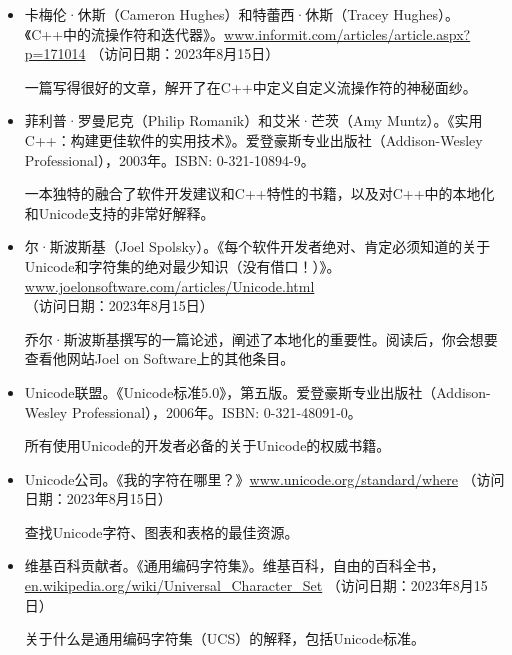 
\begin{itemize}
\item
卡梅伦·休斯（Cameron Hughes）和特蕾西·休斯（Tracey Hughes）。《C++中的流操作符和迭代器》。\url{www.informit.com/articles/article.aspx?p=171014} （访问日期：2023年8月15日）

\hspace*{\fill}

一篇写得很好的文章，解开了在C++中定义自定义流操作符的神秘面纱。

\hspace*{\fill}

\item
菲利普·罗曼尼克（Philip Romanik）和艾米·芒茨（Amy Muntz）。《实用C++：构建更佳软件的实用技术》。爱登豪斯专业出版社（Addison-Wesley Professional），2003年。ISBN: 0-321-10894-9。

\hspace*{\fill}

一本独特的融合了软件开发建议和C++特性的书籍，以及对C++中的本地化和Unicode支持的非常好解释。

\hspace*{\fill}

\item
尔·斯波斯基（Joel Spolsky）。《每个软件开发者绝对、肯定必须知道的关于Unicode和字符集的绝对最少知识（没有借口！）》。\url{www.joelonsoftware.com/articles/Unicode.html} （访问日期：2023年8月15日）

\hspace*{\fill}

乔尔·斯波斯基撰写的一篇论述，阐述了本地化的重要性。阅读后，你会想要查看他网站Joel on Software上的其他条目。

\hspace*{\fill}

\item
Unicode联盟。《Unicode标准5.0》，第五版。爱登豪斯专业出版社（Addison-Wesley Professional），2006年。ISBN: 0-321-48091-0。

\hspace*{\fill}

所有使用Unicode的开发者必备的关于Unicode的权威书籍。

\hspace*{\fill}

\item
Unicode公司。《我的字符在哪里？》\url{www.unicode.org/standard/where} （访问日期：2023年8月15日）

查找Unicode字符、图表和表格的最佳资源。

\item
维基百科贡献者。《通用编码字符集》。维基百科，自由的百科全书，\url{en.wikipedia.org/wiki/Universal_Character_Set} （访问日期：2023年8月15日）

关于什么是通用编码字符集（UCS）的解释，包括Unicode标准。
\end{itemize}

